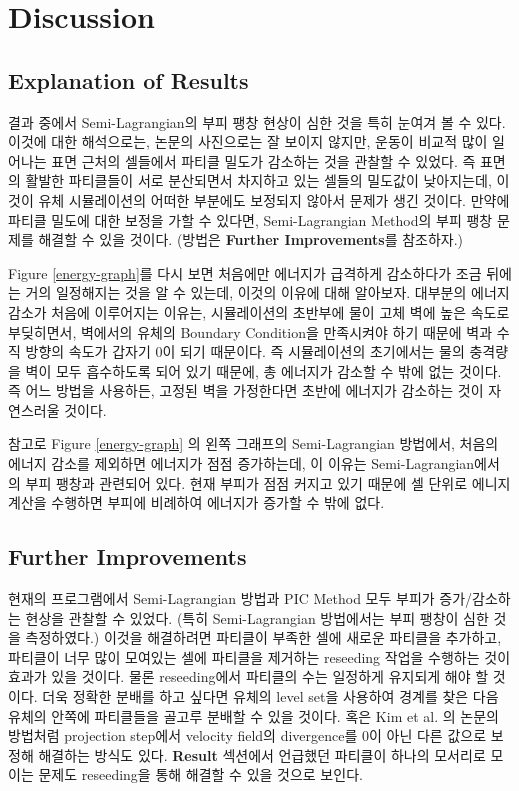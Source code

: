 \documentclass[12pt, A4]{article}
\begin{document}
\section{Discussion}

\subsection{Explanation of Results}

결과 중에서 Semi-Lagrangian의 부피 팽창 현상이 심한 것을 특히 눈여겨 볼 수 있다. 이것에 대한 해석으로는, 논문의 사진으로는 잘 보이지 않지만, 운동이 비교적 많이 일어나는 표면 근처의 셀들에서 파티클 밀도가 감소하는 것을 관찰할 수 있었다. 즉 표면의 활발한 파티클들이 서로 분산되면서 차지하고 있는 셀들의 밀도값이 낮아지는데, 이것이 유체 시뮬레이션의 어떠한 부분에도 보정되지 않아서 문제가 생긴 것이다. 만약에 파티클 밀도에 대한 보정을 가할 수 있다면, Semi-Lagrangian Method의 부피 팽창 문제를 해결할 수 있을 것이다. (방법은 \textbf{Further Improvements}를 참조하자.)

Figure \ref{energy-graph}를 다시 보면 처음에만 에너지가 급격하게 감소하다가 조금 뒤에는 거의 일정해지는 것을 알 수 있는데, 이것의 이유에 대해 알아보자. 대부분의 에너지 감소가 처음에 이루어지는 이유는, 시뮬레이션의 초반부에 물이 고체 벽에 높은 속도로 부딪히면서, 벽에서의 유체의 Boundary Condition을 만족시켜야 하기 때문에 벽과 수직 방향의 속도가 갑자기 0이 되기 때문이다. 즉 시뮬레이션의 초기에서는 물의 충격량을 벽이 모두 흡수하도록 되어 있기 때문에, 총 에너지가 감소할 수 밖에 없는 것이다. 즉 어느 방법을 사용하든, 고정된 벽을 가정한다면 초반에 에너지가 감소하는 것이 자연스러울 것이다.

참고로 Figure \ref{energy-graph} 의 왼쪽 그래프의 Semi-Lagrangian 방법에서, 처음의 에너지 감소를 제외하면 에너지가 점점 증가하는데, 이 이유는 Semi-Lagrangian에서의 부피 팽창과 관련되어 있다. 현재 부피가 점점 커지고 있기 때문에 셀 단위로 에니지 계산을 수행하면 부피에 비례하여 에너지가 증가할 수 밖에 없다.

\subsection{Further Improvements}

현재의 프로그램에서 Semi-Lagrangian 방법과 PIC Method 모두 부피가 증가/감소하는 현상을 관찰할 수 있었다. (특히 Semi-Lagrangian 방법에서는 부피 팽창이 심한 것을 측정하였다.) 이것을 해결하려면 파티클이 부족한 셀에 새로운 파티클을 추가하고, 파티클이 너무 많이 모여있는 셀에 파티클을 제거하는 reseeding 작업을 수행하는 것이 효과가 있을 것이다. \cite[p. 117]{fluid-sim-cg} 물론 reseeding에서 파티클의 수는 일정하게 유지되게 해야 할 것이다. 더욱 정확한 분배를 하고 싶다면 유체의 level set을 사용하여 경계를 찾은 다음 유체의 안쪽에 파티클들을 골고루 분배할 수 있을 것이다.  혹은 Kim et al. \cite{volume-preservation} 의 논문의 방법처럼 projection step에서 velocity field의 divergence를 0이 아닌 다른 값으로 보정해 해결하는 방식도 있다. \textbf{Result} 섹션에서 언급했던 파티클이 하나의 모서리로 모이는 문제도 reseeding을 통해 해결할 수 있을 것으로 보인다.
\end{document}
